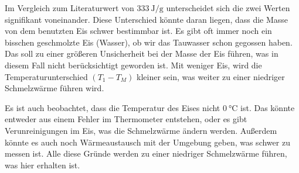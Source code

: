 Im Vergleich zum Literaturwert von $\SI{333}{\joule\per\gram}$ unterscheidet sich die zwei Werten signifikant voneinander. Diese Unterschied könnte daran liegen, dass die Masse von dem benutzten Eis schwer bestimmbar ist. Es gibt oft immer noch ein bisschen geschmolzte Eis (Wasser), ob wir das Tauwasser schon gegossen haben. Das soll zu einer größeren Unsicherheit bei der Masse der Eis führen, was in diesem Fall nicht berücksichtigt geworden ist. Mit weniger Eis, wird die Temperaturunterschied $(T_1 - T_M)$ kleiner sein, was weiter zu einer niedriger Schmelzwärme führen wird.

Es ist auch beobachtet, dass die Temperatur des Eises nicht $\SI{0}{\celsius}$ ist. Das könnte entweder aus einem Fehler im Thermometer entstehen, oder es gibt Verunreinigungen im Eis, was die Schmelzwärme ändern werden. Außerdem könnte es auch noch Wärmeaustausch mit der Umgebung geben, was schwer zu messen ist. Alle diese Gründe werden zu einer niedriger Schmelzwärme führen, was hier erhalten ist. 